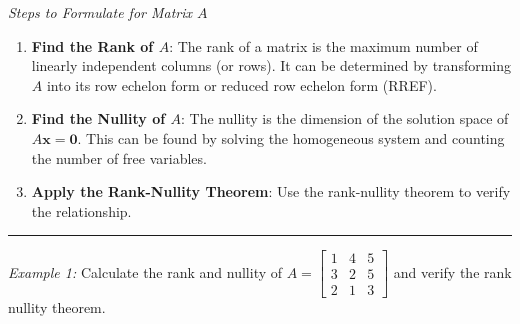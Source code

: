 \documentclass[
  letterpaper,
  DIV=11,
  numbers=noendperiod]{scrreprt}
\theoremstyle{plain}
\theoremstyle{definition}
\theoremstyle{remark}
\begin{document}
\emph{Steps to Formulate for Matrix \(A\)}

\begin{enumerate}
\def\labelenumi{\arabic{enumi}.}
\item
  \textbf{Find the Rank of \(A\)}: The rank of a matrix is the maximum
  number of linearly independent columns (or rows). It can be determined
  by transforming \(A\) into its row echelon form or reduced row echelon
  form (RREF).
\item
  \textbf{Find the Nullity of \(A\)}: The nullity is the dimension of
  the solution space of \(A \mathbf{x} = \mathbf{0}\). This can be found
  by solving the homogeneous system and counting the number of free
  variables.
\item
  \textbf{Apply the Rank-Nullity Theorem}: Use the rank-nullity theorem
  to verify the relationship.
\end{enumerate}

\begin{center}\rule{0.5\linewidth}{0.5pt}\end{center}

\emph{Example 1:} Calculate the rank and nullity of
\(A=\begin{bmatrix}   1 & 4 & 5 \\   3 & 2 & 5 \\   2 & 1 & 3   \end{bmatrix}\)
and verify the rank nullity theorem.
\end{document}
